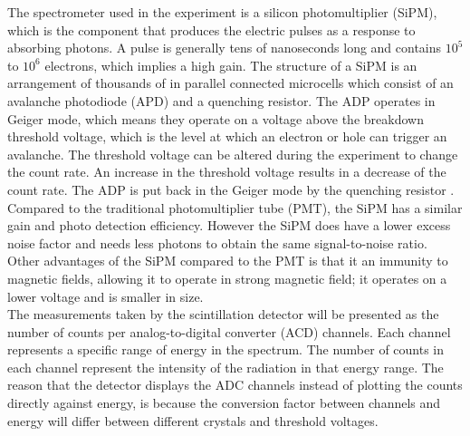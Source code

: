 \documentclass[a4paper, 11pt, table]{article}
\begin{document}

The spectrometer used in the experiment is a silicon photomultiplier (SiPM), which is the component that produces the electric pulses as a response to absorbing photons. A pulse is generally tens of nanoseconds long and contains $10^5$ to $10^6$ electrons, which implies a high gain.
The structure of a SiPM is an arrangement of thousands of in parallel connected microcells which consist of an avalanche photodiode (APD) and a quenching resistor. The ADP operates in Geiger mode, which means they operate on a voltage above the breakdown threshold voltage, which is the level at which an electron or hole can trigger an avalanche. The threshold voltage can be altered during the experiment to change the count rate. An increase in the threshold voltage results in a decrease of the count rate. The ADP is put back in the Geiger mode by the quenching resistor \cite{kk_2016_what}.\\

Compared to the traditional photomultiplier tube (PMT), the SiPM has a similar gain and photo detection efficiency. However the SiPM does have a lower excess noise factor and needs less photons to obtain the same signal-to-noise ratio. Other advantages of the SiPM compared to the PMT is that it an immunity to magnetic fields, allowing it to operate in strong magnetic field; it operates on a lower voltage and is smaller in size. \cite{WAGATSUMA2017203}\\

The measurements taken by the scintillation detector will be presented as the number of counts per analog-to-digital converter (ACD) channels. Each channel represents a specific range of energy in the spectrum. The number of counts in each channel represent the intensity of the radiation in that energy range. The reason that the detector displays the ADC channels instead of plotting the counts directly against energy, is because the conversion factor between channels and energy will differ between different crystals and threshold voltages.
\end{document}
